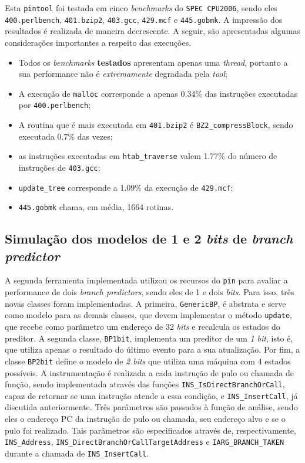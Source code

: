 \documentclass[12pt]{article}
\begin{document}
Esta \texttt{pintool} foi testada em cinco \textit{benchmarks} do
\texttt{SPEC CPU2006}, sendo eles \texttt{400.perlbench}, \texttt{401.bzip2},
\texttt{403.gcc}, \texttt{429.mcf}  e \texttt{445.gobmk}. A impressão dos resultados é
realizada de maneira decrescente. A seguir, são apresentadas algumas
considerações importantes a respeito das execuções.

\begin {itemize}
  \item Todos os \textit{benchmarks} \textbf{testados} apresentam apenas uma
  \textit{thread}, portanto a sua performance não é \textit{extremamente}
  degradada pela \textit{tool};
  \item A execução de \texttt{malloc} corresponde a apenas 0.34\% das instruções
  executadas por \texttt{400.perlbench};
  \item A routina que é mais executada em \texttt{401.bzip2} é
  \texttt{BZ2\_compressBlock}, sendo executada 0.7\% das vezes;
  \item as instruções executadas em \texttt{htab\_traverse} valem 1.77\% do
  número de instruções de \texttt{403.gcc};
  \item \texttt{update\_tree} corresponde a 1.09\% da execução de
  \texttt{429.mcf};
  \item \texttt{445.gobmk} chama, em média, 1664 rotinas.  
\end{itemize}

\subsection{Simulação dos modelos de 1 e 2 \textit{bits} de \textit{branch
predictor}}

A segunda ferramenta implementada utilizou os recursos do \texttt{pin} para
avaliar a performance de dois \textit{branch predictors}, sendo eles de 1 e dois
\textit{bits}. Para isso, três novas classes foram implementadas. A primeira,
\texttt{GenericBP}, é abstrata e serve como modelo para as demais classes, que
devem implementar o método \texttt{update}, que recebe como parâmetro um
endereço de 32 \textit{bits} e recalcula os estados do preditor. A segunda
classe, \texttt{BP1bit}, implementa um preditor de um \textit{1 bit}, isto é,
que utiliza apenas o resultado do último evento para a sua atualização. Por fim,
a classe \texttt{BP2bit} define o modelo de \textit{2 bits} que utiliza uma
máquina com 4 estados possíveis. A instrumentação é realizada a cada instrução
de pulo ou chamada de função, sendo implementada através das funções
\texttt{INS\_IsDirectBranchOrCall}, capaz de retornar se uma instrução atende a
essa condição, e \texttt{INS\_InsertCall}, já discutida anteriormente. Três
parâmetros são passados à função de análise, sendo eles o endereço PC da
instrução de pulo ou chamada, seu endereço alvo e se o pulo foi realizado. Tais
parâmetros são especificados através de, respectivamente,
\texttt{INS\_Address}, \texttt{INS\_DirectBranchOrCallTargetAddress} e
\texttt{IARG\_BRANCH\_TAKEN} durante a chamada de \texttt{INS\_InsertCall}.
\end{document}
